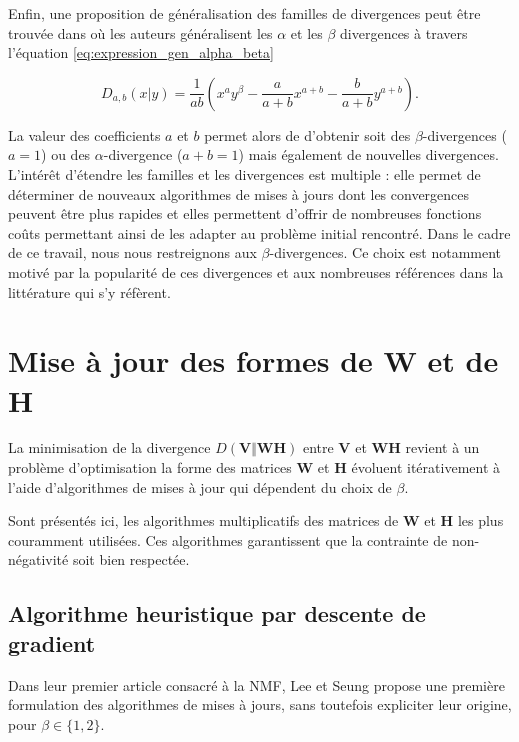 Enfin, une proposition de généralisation des familles de divergences peut être trouvée dans \cite{cichocki_generalized_2011} où les auteurs généralisent les $\alpha$ et les $\beta$ divergences à travers l'équation  \ref{eq:expression_gen_alpha_beta} 

\begin{equation}\label{eq:expression_gen_alpha_beta}
D_{a, b}(x \vert y) = \frac{1}{a b}\left(x^{a}y^{\beta}- \frac{a}{a+b}x^{a + b}-\frac{b}{a+b}y^{a+b} \right).
\end{equation}

La valeur des coefficients $a$ et $b$ permet alors de d'obtenir soit des $\beta$-divergences ($a = 1$) ou des $\alpha$-divergence ($a+b = 1$) mais également de nouvelles divergences. L'intérêt d'étendre les familles et les divergences est multiple : elle permet de déterminer de nouveaux algorithmes de mises à jours dont les convergences peuvent être plus rapides et elles permettent d'offrir de nombreuses fonctions coûts permettant ainsi de les adapter au problème initial rencontré. Dans le cadre de ce travail, nous nous restreignons aux $\beta$-divergences. Ce choix est notamment motivé par la popularité de ces divergences et aux nombreuses références dans la littérature qui s'y réfèrent.

\section{Mise à jour des formes de \textbf{W} et de \textbf{H}}

La minimisation de la divergence $D(\mathbf{V} \Vert \mathbf{WH})$ entre $\mathbf{V}$ et $\mathbf{WH}$ revient à un problème d'optimisation la forme des matrices $\mathbf{W}$ et $\mathbf{H}$ évoluent itérativement à l'aide d'algorithmes de mises à jour qui dépendent du choix de $\beta$. 

Sont présentés ici, les algorithmes multiplicatifs des matrices de $\mathbf{W}$ et $\mathbf{H}$ les plus couramment utilisées. Ces algorithmes garantissent que la contrainte de non-négativité soit bien respectée.

\subsection{Algorithme heuristique par descente de gradient}

Dans leur premier article consacré à la NMF, Lee et Seung \cite{lee_learning_1999} propose une première formulation des algorithmes de mises à jours, sans toutefois expliciter leur origine,  pour $\beta  \in \lbrace 1,2 \rbrace$.

